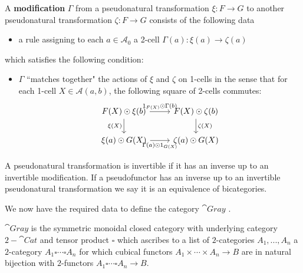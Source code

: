 \begin{defn}{}
    A \textbf{modification} $\Gamma$ from a pseudonatural transformation $\xi:F\rightarrow G$ to another pseudonatural transformation $\zeta:F\rightarrow G$ consists of the following data
    \begin{itemize}
        \item a rule assigning to each $a \in \mathcal{A}_0$ a 2-cell $\Gamma(a):\xi(a)\rightarrow \zeta(a)$
    \end{itemize}
    which satisfies the following condition:
    \begin{itemize}
        \item $\Gamma$ ``matches together" the actions of $\xi$ and $\zeta$ on 1-cells in the sense that for each 1-cell $X \in \mathcal{A}(a,b)$, the following square of 2-cells commutes:
        \[\begin{tikzcd}
        	{F(X)\odot \xi(b)} & {F(X)\odot \zeta(b)} \\
        	{\xi(a)\odot G(X)} & {\zeta(a)\odot G(X)}
        	\arrow["{1_{F(X)}\odot \Gamma(b)}", from=1-1, to=1-2]
        	\arrow["{\zeta(X)}", from=1-2, to=2-2]
        	\arrow["{\xi(X)}"', from=1-1, to=2-1]
        	\arrow["{\Gamma(a)\odot 1_{G(X)}}"', from=2-1, to=2-2]
        \end{tikzcd}\]
    \end{itemize}
\end{defn}

A pseudonatural transformation is invertible if it has an inverse up to an invertible modification. If a pseudofunctor has an inverse up to an invertible pseudonatural transformation we say it is an equivalence of bicategories.


We now have the required data to define the category $\cat{Gray}$ \cite{GordonRobert1995Cft}.

\begin{defn}{}
    $\cat{Gray}$ is the symmetric monoidal closed category with underlying category $2-\cat{Cat}$ and tensor product $\square$ which ascribes to a list of $2$-categories $A_1,...,A_n$ a $2$-category $A_1\square\cdots \square A_n$ for which cubical functors $A_1\times \cdots \times A_n\rightarrow B$ are in natural bijection with $2$-functors $A_1\square \cdots \square A_n\rightarrow B$.
\end{defn}



